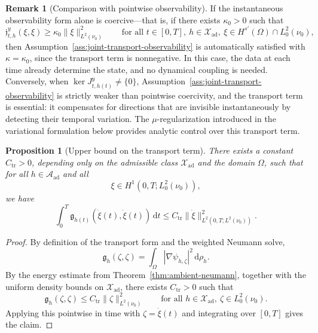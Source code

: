 \documentclass{article}
\newtheorem{proposition}[theorem]{Proposition}
\theoremstyle{definition}
\newtheorem{remark}[theorem]{Remark}
\renewcommand{\d}{\mathrm{d}}
\begin{document}
\begin{remark}[Comparison with pointwise observability]
    \label{rem:pointwise-vs-pathwise}
    If the instantaneous observability form alone is coercive---that is, if there exists
    \(\kappa_0>0\) such that
    \[
        \mathfrak j_{t,h}^{y}(\xi,\xi)\ge \kappa_0 \|\xi\|_{L^2(\nu_0)}^2
        \qquad
        \text{for all } t\in[0,T],\ h\in\mathcal X_{\mathrm{ad}},\
        \xi\in H^{s'}(\Omega)\cap L^2_0(\nu_0),
    \]
    then Assumption~\ref{ass:joint-transport-observability} is automatically satisfied with
    \(\kappa=\kappa_0\), since the transport term is nonnegative. In this case, the data at each time
    already determine the state, and no dynamical coupling is needed. Conversely, when
    \(\ker J_{t,h(t)}^{y}\neq\{0\}\), Assumption~\ref{ass:joint-transport-observability} is strictly
    weaker than pointwise coercivity, and the transport term is essential: it compensates for
    directions that are invisible instantaneously by detecting their temporal variation. The
    \(\mu\)-regularization introduced in the variational formulation below provides analytic control over
    this transport term.
\end{remark}

\begin{proposition}[Upper bound on the transport term]
    \label{prop:transport-term-upper-bound}
    There exists a constant \(C_{\mathrm{tr}}>0\), depending only on the admissible class
    \(\mathcal X_{\mathrm{ad}}\) and the domain \(\Omega\), such that for all
    \(h\in\mathcal A_{\mathrm{ad}}\) and all
    \[
        \xi\in H^1(0,T;L^2_0(\nu_0)),
    \]
    we have
    \[
        \int_0^T \mathfrak g_{h(t)}(\dot\xi(t),\dot\xi(t))\,\d t
        \le
        C_{\mathrm{tr}}\|\dot\xi\|_{L^2(0,T;L^2(\nu_0))}^2.
    \]
\end{proposition}

\begin{proof}
    By definition of the transport form and the weighted Neumann solve,
    \[
        \mathfrak g_h(\zeta,\zeta)
        =
        \int_\Omega |\nabla\psi_{h,\zeta}|^2\,\d\rho_h.
    \]
    By the energy estimate from Theorem~\ref{thm:ambient-neumann}, together with the uniform density
    bounds on \(\mathcal X_{\mathrm{ad}}\), there exists \(C_{\mathrm{tr}}>0\) such that
    \[
        \mathfrak g_h(\zeta,\zeta)
        \le
        C_{\mathrm{tr}}\|\zeta\|_{L^2(\nu_0)}^2
        \qquad
        \text{for all } h\in\mathcal X_{\mathrm{ad}},\ \zeta\in L^2_0(\nu_0).
    \]
    Applying this pointwise in time with \(\zeta=\dot\xi(t)\) and integrating over \([0,T]\) gives the
    claim.
\end{proof}
\end{document}
